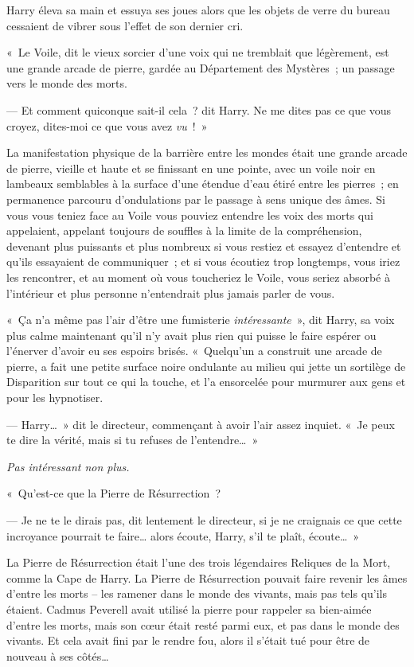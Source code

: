 Harry éleva sa main et essuya ses joues alors que les objets de verre du bureau cessaient de vibrer sous l'effet de son dernier cri.

«~Le Voile, dit le vieux sorcier d'une voix qui ne tremblait que légèrement, est une grande arcade de pierre, gardée au Département des Mystères~; un passage vers le monde des morts.

--- Et comment quiconque sait-il cela~? dit Harry. Ne me dites pas ce que vous croyez, dites-moi ce que vous avez \emph{vu}~!~»

La manifestation physique de la barrière entre les mondes était une grande arcade de pierre, vieille et haute et se finissant en une pointe, avec un voile noir en lambeaux semblables à la surface d'une étendue d'eau étiré entre les pierres~; en permanence parcouru d'ondulations par le passage à sens unique des âmes. Si vous vous teniez face au Voile vous pouviez entendre les voix des morts qui appelaient, appelant toujours de souffles à la limite de la compréhension, devenant plus puissants et plus nombreux si vous restiez et essayez d'entendre et qu'ils essayaient de communiquer~; et si vous écoutiez trop longtemps, vous iriez les rencontrer, et au moment où vous toucheriez le Voile, vous seriez absorbé à l'intérieur et plus personne n'entendrait plus jamais parler de vous.

«~Ça n'a même pas l'air d'être une fumisterie \emph{intéressante}~», dit Harry, sa voix plus calme maintenant qu'il n'y avait plus rien qui puisse le faire espérer ou l'énerver d'avoir eu ses espoirs brisés. «~Quelqu'un a construit une arcade de pierre, a fait une petite surface noire ondulante au milieu qui jette un sortilège de Disparition sur tout ce qui la touche, et l'a ensorcelée pour murmurer aux gens et pour les hypnotiser.

--- Harry…~» dit le directeur, commençant à avoir l'air assez inquiet. «~Je peux te dire la vérité, mais si tu refuses de l'entendre…~»

\emph{Pas intéressant non plus.}

«~Qu'est-ce que la Pierre de Résurrection~?

--- Je ne te le dirais pas, dit lentement le directeur, si je ne craignais ce que cette incroyance pourrait te faire… alors écoute, Harry, s'il te plaît, écoute…~»

La Pierre de Résurrection était l'une des trois légendaires Reliques de la Mort, comme la Cape de Harry. La Pierre de Résurrection pouvait faire revenir les âmes d'entre les morts -- les ramener dans le monde des vivants, mais pas tels qu'ils étaient. Cadmus Peverell avait utilisé la pierre pour rappeler sa bien-aimée d'entre les morts, mais son cœur était resté parmi eux, et pas dans le monde des vivants. Et cela avait fini par le rendre fou, alors il s'était tué pour être de nouveau à ses côtés…

